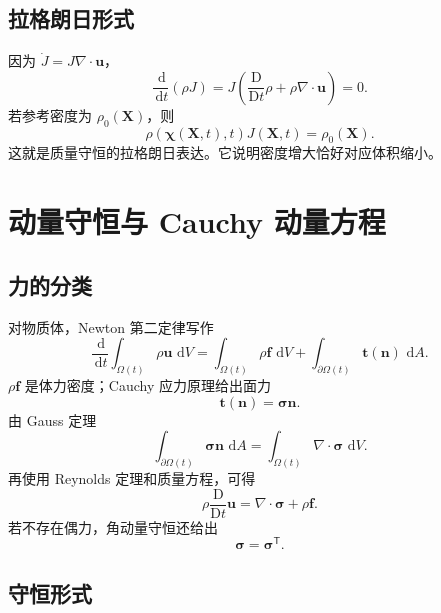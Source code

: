\documentclass[cn,hazy,blue,11pt,normal]{elegantnote}
\numberwithin{equation}{section}
\newcommand{\dd}{\,\mathrm d}
\newcommand{\Dt}{\frac{\mathrm D}{\mathrm Dt}}
\newcommand{\vct}[1]{\bm{#1}}
\newcommand{\ten}[1]{\bm{#1}}
\begin{document}
\subsection{拉格朗日形式}

因为 $\dot J=J\nabla\cdot\vct{u}$，
\begin{equation}
 \frac{\dd}{\dd t}(\rho J)
 =J\left(\Dt\rho+\rho\nabla\cdot\vct{u}\right)=0.
\end{equation}
若参考密度为 $\rho_0(\vct{X})$，则
\begin{equation}
 \boxed{\rho(\vct{\chi}(\vct{X},t),t)J(\vct{X},t)=\rho_0(\vct{X}).}
\end{equation}
这就是质量守恒的拉格朗日表达。它说明密度增大恰好对应体积缩小。

\section{动量守恒与 Cauchy 动量方程}

\subsection{力的分类}

对物质体，Newton 第二定律写作
\begin{equation}
 \frac{\dd}{\dd t}\int_{\Omega(t)}\rho\vct{u}\,\dd V
 =\int_{\Omega(t)}\rho\vct{f}\,\dd V
 +\int_{\partial\Omega(t)}\vct{t}(\vct{n})\,\dd A.
\end{equation}
$\rho\vct f$ 是体力密度；Cauchy 应力原理给出面力
\begin{equation}
 \vct{t}(\vct{n})=\ten{\sigma}\vct{n}.
\end{equation}
由 Gauss 定理
\begin{equation}
 \int_{\partial\Omega(t)}\ten{\sigma}\vct{n}\,\dd A
 =\int_{\Omega(t)}\nabla\cdot\ten{\sigma}\,\dd V.
\end{equation}
再使用 Reynolds 定理和质量方程，可得
\begin{equation}
 \boxed{\rho\Dt\vct{u}=\nabla\cdot\ten{\sigma}+\rho\vct{f}.} \label{eq:cauchy-momentum}
\end{equation}
若不存在偶力，角动量守恒还给出
\begin{equation}
 \ten{\sigma}=\ten{\sigma}^{\mathsf T}.
\end{equation}

\subsection{守恒形式}
\end{document}
